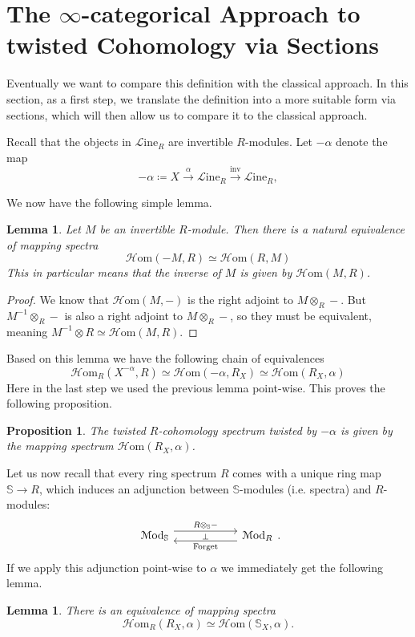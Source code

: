 \documentclass[a4paper]{book}
\newcommand{\lH}{\mathcal{H}}
\newcommand{\lL}{\mathcal{L}}
\newcommand{\lM}{\mathcal{M}}
\newcommand{\bS}{\mathbb{S}}
\newcommand{\Hom}{\lH\mathrm{om}} %
\renewcommand{\Line}{\lL\mathrm{ine}} %
\newcommand{\Mod}{\lM\mathrm{od}} %
\newtheorem{lemma}[equation]{Lemma}
\newtheorem{proposition}[equation]{Proposition}
\theoremstyle{definition}
\theoremstyle{remark}
\numberwithin{equation}{section}
\begin{document}
\section{The \texorpdfstring{$\infty$}{oo}-categorical Approach to twisted Cohomology via Sections}
Eventually we want to compare this definition with the classical approach. In this section, as a first step, we translate the definition into a more suitable form via sections, which will then allow us to compare it to the classical approach. 

Recall that the objects in $\Line_R$ are invertible $R$-modules. Let $-\alpha$ denote the map 
\[ - \alpha\coloneq X \xrightarrow{\alpha} \Line_R \xrightarrow{\mathrm{inv}} \Line_R, \]

We now have the following simple lemma. 

\begin{lemma}
	Let $M$ be an invertible	$R$-module. Then there is a natural equivalence of mapping spectra
	\[ \Hom(-M,R) \simeq \Hom(R,M) \] 
 This in particular means that the inverse of $M$ is given by $\Hom(M,R)$.
\end{lemma}

\begin{proof}
 We know that $\Hom(M,-)$ is the right adjoint to $M \otimes_R -$. But $M^{-1} \otimes_R -$ is also a right adjoint to $M \otimes_R -$, so they must be equivalent, meaning $M^{-1} \otimes R \simeq \Hom(M,R)$.  
\end{proof}

Based on this lemma we have the following chain of equivalences 
\[ \Hom_R(X^{-\alpha},R) \simeq \Hom(-\alpha,R_X) \simeq \Hom(R_X,\alpha) \]
Here in the last step we used the previous lemma point-wise. This proves the following proposition.

\begin{proposition}
	 The twisted $R$-cohomology spectrum twisted by $-\alpha$ is given by the mapping spectrum $\Hom(R_X,\alpha)$.
\end{proposition}

Let us now recall that every ring spectrum $R$ comes with a unique ring map $\bS \to R$, which induces an adjunction between $\bS$-modules (i.e. spectra) and $R$-modules:
\[
\begin{tikzcd}[column sep=2cm]
	\Mod_{\bS} \arrow[r, shift left=1.8, "R \otimes_{\bS} -", "\bot"'] & \Mod_R \arrow[l, shift left=1.8, "\text{Forget}"]
\end{tikzcd}.
\]
If we apply this adjunction point-wise to $\alpha$ we immediately get the following lemma.
\begin{lemma}
	There is an equivalence of mapping spectra \[ \Hom_R(R_X,\alpha) \simeq \Hom(\bS_X,\alpha). \]
\end{lemma}
\end{document}
